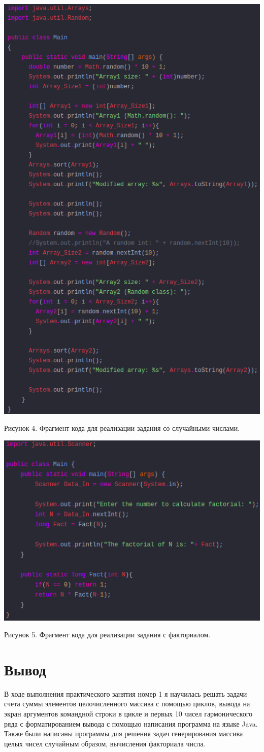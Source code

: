 \documentclass{article}
\begin{document}
\includegraphics[width=0.9\linewidth]{view4.png}

\caption{Рисунок 4. Фрагмент кода для реализации задания со случайными числами.}

\includegraphics[width=0.7\linewidth]{view5.png}

\caption{Рисунок 5. Фрагмент кода для реализации задания с факториалом.}

\section{Вывод}
В ходе выполнения практического занятия номер 1 я научилась решать задачи счета суммы элементов целочисленного массива с помощью циклов, вывода на экран аргументов командной строки в цикле и первых 10 чисел гармонического ряда с форматированием вывода с помощью написания программа на языке Java. Также были написаны программы для решения задач генерирования массива целых чисел случайным образом, вычисления факториала числа.
\end{document}
